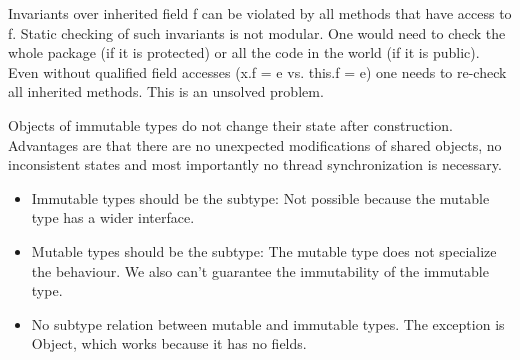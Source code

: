 \begin{mytitle} Invariants over inherited field f can be violated by all methods that have access to f. Static checking of such invariants is not modular. One would need to check the whole package (if it is protected) or all the code in the world (if it is public). Even without qualified field accesses (x.f = e vs. this.f = e) one needs to re-check all inherited methods. This is an unsolved problem.
\end{mytitle}
\begin{mytitle} Objects of immutable types do not change their state after construction. Advantages are that there are no unexpected modifications of shared objects, no inconsistent states and most importantly no thread synchronization is necessary. 
\end{mytitle}
\begin{mytitle}\hfill
\begin{itemize}
    \item Immutable types should be the subtype: Not possible because the mutable type has a wider interface.
    \item Mutable types should be the subtype: The mutable type does not specialize the behaviour. We also can't guarantee the immutability of the immutable type.
    \item No subtype relation between mutable and immutable types. The exception is Object, which works because it has no fields. 
\end{itemize}
\end{mytitle}